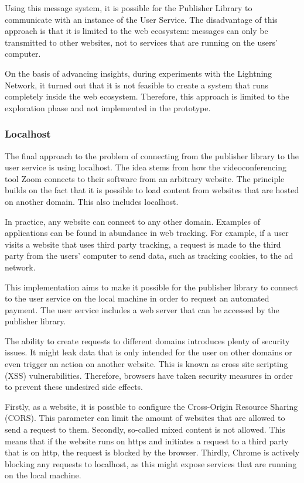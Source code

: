 Using this message system, it is possible for the Publisher Library to communicate with an instance of the User Service. The disadvantage of this approach is that it is limited to the web ecosystem: messages can only be transmitted to other websites, not to services that are running on the users' computer. 

On the basis of advancing insights, during experiments with the Lightning Network, it turned out that it is not feasible to create a system that runs completely inside the web ecosystem. Therefore, this approach is limited to the exploration phase and not implemented in the prototype.

\subsubsection{Localhost}
\label{sec:localhost}

The final approach to the problem of connecting from the publisher library to the user service is using localhost. The idea stems from how the videoconferencing tool Zoom connects to their software from an arbitrary website. The principle builds on the fact that it is possible to load content from websites that are hosted on another domain. This also includes localhost.

In practice, any website can connect to any other domain. Examples of applications can be found in abundance in web tracking. For example, if a user visits a website that uses third party tracking, a request is made to the third party from the users' computer to send data, such as tracking cookies, to the ad network. 

This implementation aims to make it possible for the publisher library to connect to the user service on the local machine in order to request an automated payment. The user service includes a web server that can be accessed by the publisher library. 

The ability to create requests to different domains introduces plenty of security issues. It might leak data that is only intended for the user on other domains or even trigger an action on another website. This is known as cross site scripting (XSS) vulnerabilities. Therefore, browsers have taken security measures in order to prevent these undesired side effects.

Firstly, as a website, it is possible to configure the Cross-Origin Resource Sharing (CORS). This parameter can limit the amount of websites that are allowed to send a request to them. Secondly, so-called mixed content is not allowed. This means that if the website runs on https and initiates a request to a third party that is on http, the request is blocked by the browser. Thirdly, Chrome is actively blocking any requests to localhost, as this might expose services that are running on the local machine.

